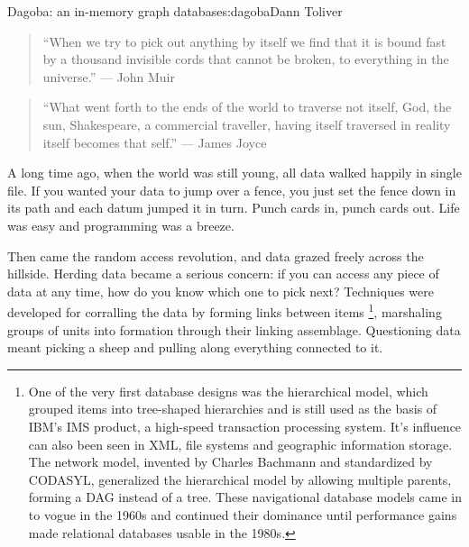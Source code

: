 \begin{aosachapter}{Dagoba: an in-memory graph database}{s:dagoba}{Dann Toliver}

\label{prologue}

\begin{quote}
``When we try to pick out anything by itself we find that it is bound
fast by a thousand invisible cords that cannot be broken, to everything
in the universe.'' --- John Muir
\end{quote}

\begin{quote}
``What went forth to the ends of the world to traverse not itself, God,
the sun, Shakespeare, a commercial traveller, having itself traversed in
reality itself becomes that self.'' --- James Joyce
\end{quote}

A long time ago, when the world was still young, all data walked happily
in single file. If you wanted your data to jump over a fence, you just
set the fence down in its path and each datum jumped it in turn. Punch
cards in, punch cards out. Life was easy and programming was a breeze.

Then came the random access revolution, and data grazed freely across
the hillside. Herding data became a serious concern: if you can access
any piece of data at any time, how do you know which one to pick next?
Techniques were developed for corralling the data by forming links
between items \footnote{One of the very first database designs was the
  hierarchical model, which grouped items into tree-shaped hierarchies
  and is still used as the basis of IBM's IMS product, a high-speed
  transaction processing system. It's influence can also been seen in
  XML, file systems and geographic information storage. The network
  model, invented by Charles Bachmann and standardized by CODASYL,
  generalized the hierarchical model by allowing multiple parents,
  forming a DAG instead of a tree. These navigational database models
  came in to vogue in the 1960s and continued their dominance until
  performance gains made relational databases usable in the 1980s.},
marshaling groups of units into formation through their linking
assemblage. Questioning data meant picking a sheep and pulling along
everything connected to it.


\end{aosachapter}
